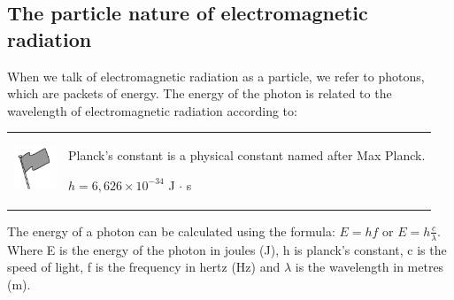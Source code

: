             \subsection{ The particle nature of electromagnetic radiation}
            \nopagebreak
      \label{m38778*id188832}When we talk of electromagnetic radiation as a particle, we refer to photons, which are packets of energy. The energy of the photon is related to the wavelength of electromagnetic radiation according to:\par 
\label{m38778*fhsst!!!underscore!!!id476}\begin{definition}
	  \begin{tabular*}{15 cm}{m{15 mm}m{}}
	\hspace*{-50pt}  \includegraphics[width=0.5in]{col11305.imgs/psflag2.png}   & \Definition{   \label{id2454271}\textbf{ Planck's constant }} { \label{m38778*meaningfhsst!!!underscore!!!id476}
      \label{m38778*id188843}Planck's constant is a physical constant named after Max Planck.\par 
      \label{m38778*id188849}$h=6,626\ensuremath{\times}{10}^{-34}$ J $\ensuremath{\cdot}$ s
 \par 
       } 
      \end{tabular*}
      \end{definition}
      \label{m38778*id188898}The energy of a photon can be calculated using the formula: $E=hf$ or $E=h\frac{c}{\lambda }$.
Where E is the energy of the photon in joules (J), h is planck's constant, c is the speed of light, f is the frequency in hertz (Hz) and $\lambda $ is the wavelength in metres (m).\par 
\label{m38778*secfhsst!!!underscore!!!id483}\vspace{.5cm} 
    \pagebreak  
